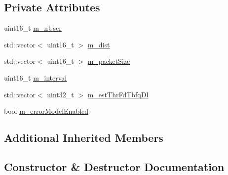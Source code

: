\subsection*{Private Attributes}
\begin{DoxyCompactItemize}
\item 
uint16\+\_\+t \hyperlink{classLenaFdTbfqFfMacSchedulerTestCase2_a7958cd8dfbb944caea78b5208a737625}{m\+\_\+n\+User}
\item 
std\+::vector$<$ uint16\+\_\+t $>$ \hyperlink{classLenaFdTbfqFfMacSchedulerTestCase2_ac7e6b74e4a880dfd2874f66d4bf38879}{m\+\_\+dist}
\item 
std\+::vector$<$ uint16\+\_\+t $>$ \hyperlink{classLenaFdTbfqFfMacSchedulerTestCase2_ad5516b67243721378cbc5af405181602}{m\+\_\+packet\+Size}
\item 
uint16\+\_\+t \hyperlink{classLenaFdTbfqFfMacSchedulerTestCase2_a2f29ab8ea196fc6909becc1f291eb129}{m\+\_\+interval}
\item 
std\+::vector$<$ uint32\+\_\+t $>$ \hyperlink{classLenaFdTbfqFfMacSchedulerTestCase2_a1a3ebf18eec9855afe4e3d30731ec28a}{m\+\_\+est\+Thr\+Fd\+Tbfq\+Dl}
\item 
bool \hyperlink{classLenaFdTbfqFfMacSchedulerTestCase2_a086a939ce70ca29032da90ac4bf4fe5f}{m\+\_\+error\+Model\+Enabled}
\end{DoxyCompactItemize}
\subsection*{Additional Inherited Members}


\subsection{Constructor \& Destructor Documentation}
